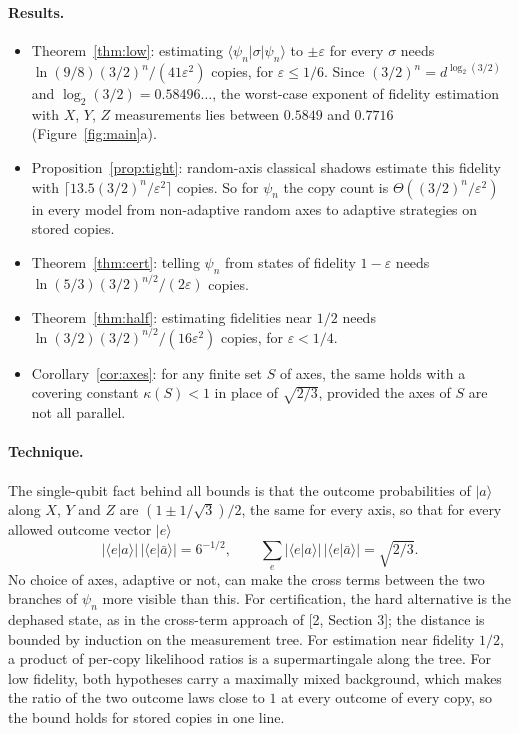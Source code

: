 \documentclass[11pt]{article}
\theoremstyle{remark}
\newcommand{\eps}{\varepsilon}
\newcommand{\ket}[1]{|#1\rangle}
\newcommand{\bra}[1]{\langle #1|}
\newcommand{\abar}{\bar a}
\begin{document}
\paragraph{Results.}
\begin{itemize}
\item Theorem~\ref{thm:low}: estimating $\bra{\psi_n}\sigma\ket{\psi_n}$ to $\pm\eps$ for every $\sigma$ needs $\ln(9/8)(3/2)^n/(41\eps^2)$ copies, for $\eps\le1/6$. Since $(3/2)^n = d^{\log_2(3/2)}$ and $\log_2(3/2) = 0.58496\ldots$, the worst-case exponent of fidelity estimation with $X$, $Y$, $Z$ measurements lies between $0.5849$ and $0.7716$ (Figure~\ref{fig:main}a).
\item Proposition~\ref{prop:tight}: random-axis classical shadows estimate this fidelity with $\lceil13.5(3/2)^n/\eps^2\rceil$ copies. So for $\psi_n$ the copy count is $\Theta((3/2)^n/\eps^2)$ in every model from non-adaptive random axes to adaptive strategies on stored copies.
\item Theorem~\ref{thm:cert}: telling $\psi_n$ from states of fidelity $1-\eps$ needs $\ln(5/3)(3/2)^{n/2}/(2\eps)$ copies.
\item Theorem~\ref{thm:half}: estimating fidelities near $1/2$ needs $\ln(3/2)(3/2)^{n/2}/(16\eps^2)$ copies, for $\eps<1/4$.
\item Corollary~\ref{cor:axes}: for any finite set $S$ of axes, the same holds with a covering constant $\kappa(S)<1$ in place of $\sqrt{2/3}$, provided the axes of $S$ are not all parallel.
\end{itemize}

\paragraph{Technique.} The single-qubit fact behind all bounds is that the outcome probabilities of $\ket a$ along $X$, $Y$ and $Z$ are $(1\pm1/\sqrt3)/2$, the same for every axis, so that for every allowed outcome vector $\ket e$
\[
|\langle e|a\rangle|\,|\langle e|\abar\rangle| = 6^{-1/2},\qquad \sum_{e} |\langle e|a\rangle|\,|\langle e|\abar\rangle| = \sqrt{2/3}.
\]
No choice of axes, adaptive or not, can make the cross terms between the two branches of $\psi_n$ more visible than this. For certification, the hard alternative is the dephased state, as in the cross-term approach of [2, Section 3]; the distance is bounded by induction on the measurement tree. For estimation near fidelity $1/2$, a product of per-copy likelihood ratios is a supermartingale along the tree. For low fidelity, both hypotheses carry a maximally mixed background, which makes the ratio of the two outcome laws close to $1$ at every outcome of every copy, so the bound holds for stored copies in one line.
\end{document}

